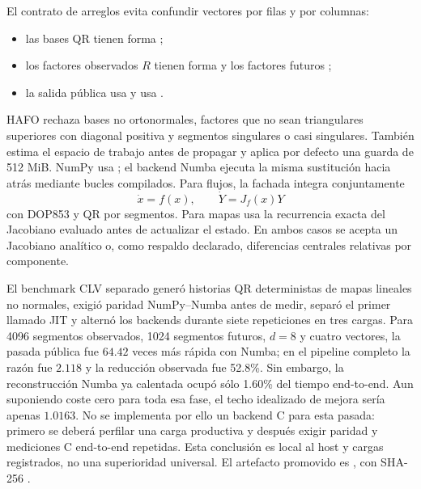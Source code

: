 El contrato de arreglos evita confundir vectores por filas y por columnas:
\begin{itemize}
  \item las bases QR tienen forma
  ;
  \item los factores observados $R$ tienen forma
   y los factores futuros
  ;
  \item la salida pública  usa
   y  usa
  .
\end{itemize}
HAFO rechaza bases no ortonormales, factores que no sean triangulares
superiores con diagonal positiva y segmentos singulares o casi singulares.
También estima el espacio de trabajo antes de propagar y aplica por defecto
una guarda de 512 MiB. NumPy usa ; el
backend Numba ejecuta la misma sustitución hacia atrás mediante bucles
compilados. Para flujos, la fachada integra conjuntamente
\[
 \dot x=f(x),\qquad \dot Y=J_f(x)Y
\]
con DOP853 y QR por segmentos. Para mapas usa la recurrencia exacta del
Jacobiano evaluado antes de actualizar el estado. En ambos casos se acepta un
Jacobiano analítico o, como respaldo declarado, diferencias centrales
relativas por componente.

El benchmark CLV separado generó historias QR deterministas de mapas lineales
no normales, exigió paridad NumPy--Numba antes de medir, separó el primer
llamado JIT y alternó los backends durante siete repeticiones en tres cargas.
Para 4096 segmentos observados, 1024 segmentos futuros, $d=8$ y cuatro
vectores, la pasada pública fue $64.42$ veces más rápida con Numba; en el
pipeline completo la razón fue $2.118$ y la reducción observada fue 52.8\%.
Sin embargo, la reconstrucción Numba ya calentada ocupó sólo 1.60\% del tiempo
end-to-end. Aun suponiendo coste cero para toda esa fase, el techo idealizado
de mejora sería apenas $1.0163$. No se implementa por ello un backend C para
esta pasada: primero se deberá perfilar una carga productiva y después exigir
paridad y mediciones C end-to-end repetidas. Esta conclusión es local al host
y cargas registrados, no una superioridad universal. El artefacto promovido
es
,
con SHA-256
.

